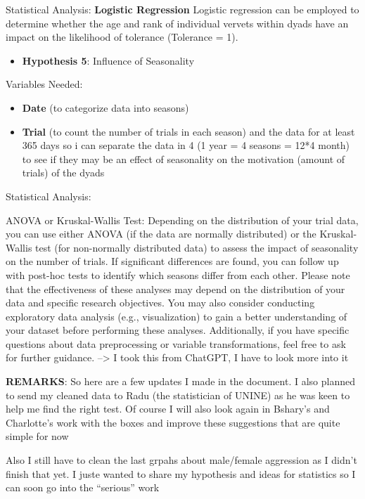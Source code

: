 \documentclass[
]{article}
\providecommand{\tightlist}{%
  \setlength{\itemsep}{0pt}\setlength{\parskip}{0pt}}
\begin{document}
Statistical Analysis: \textbf{Logistic Regression} Logistic regression
can be employed to determine whether the age and rank of individual
vervets within dyads have an impact on the likelihood of tolerance
(Tolerance = 1).

\begin{itemize}
\tightlist
\item
  \textbf{Hypothesis 5}: Influence of Seasonality
\end{itemize}

Variables Needed:

\begin{itemize}
\tightlist
\item
  \textbf{Date} (to categorize data into seasons)
\item
  \textbf{Trial} (to count the number of trials in each season) and the
  data for at least 365 days so i can separate the data in 4 (1 year = 4
  seasons = 12*4 month) to see if they may be an effect of seasonality
  on the motivation (amount of trials) of the dyads
\end{itemize}

Statistical Analysis:

ANOVA or Kruskal-Wallis Test: Depending on the distribution of your
trial data, you can use either ANOVA (if the data are normally
distributed) or the Kruskal-Wallis test (for non-normally distributed
data) to assess the impact of seasonality on the number of trials. If
significant differences are found, you can follow up with post-hoc tests
to identify which seasons differ from each other. Please note that the
effectiveness of these analyses may depend on the distribution of your
data and specific research objectives. You may also consider conducting
exploratory data analysis (e.g., visualization) to gain a better
understanding of your dataset before performing these analyses.
Additionally, if you have specific questions about data preprocessing or
variable transformations, feel free to ask for further guidance.
--\textgreater{} I took this from ChatGPT, I have to look more into it

\textbf{REMARKS}: So here are a few updates I made in the document. I
also planned to send my cleaned data to Radu (the statistician of UNINE)
as he was keen to help me find the right test. Of course I will also
look again in Bshary's and Charlotte's work with the boxes and improve
these suggestions that are quite simple for now

Also I still have to clean the last grpahs about male/female aggression
as I didn't finish that yet. I juste wanted to share my hypothesis and
ideas for statistics so I can soon go into the ``serious'' work
\end{document}
